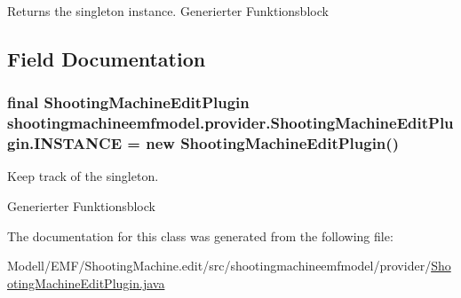 \begin{DoxyReturn}{Returns}
the singleton instance. Generierter Funktionsblock 
\end{DoxyReturn}


\subsection{Field Documentation}
\hypertarget{classshootingmachineemfmodel_1_1provider_1_1_shooting_machine_edit_plugin_abe9188941a0821d245d02e0df2854bc4}{
\subsubsection[{I\-N\-S\-T\-A\-N\-C\-E}]{\setlength{\rightskip}{0pt plus 5cm}final {\bf Shooting\-Machine\-Edit\-Plugin} shootingmachineemfmodel.\-provider.\-Shooting\-Machine\-Edit\-Plugin.\-I\-N\-S\-T\-A\-N\-C\-E = new {\bf Shooting\-Machine\-Edit\-Plugin}()\hspace{0.3cm}{\ttfamily [static]}}}\label{classshootingmachineemfmodel_1_1provider_1_1_shooting_machine_edit_plugin_abe9188941a0821d245d02e0df2854bc4}
Keep track of the singleton.

Generierter Funktionsblock 

The documentation for this class was generated from the following file\-:\begin{DoxyCompactItemize}
\item 
Modell/\-E\-M\-F/\-Shooting\-Machine.\-edit/src/shootingmachineemfmodel/provider/\hyperlink{_shooting_machine_edit_plugin_8java}{Shooting\-Machine\-Edit\-Plugin.\-java}\end{DoxyCompactItemize}
